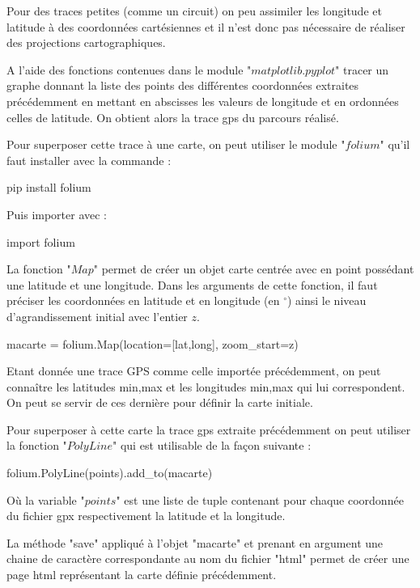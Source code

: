 Pour des traces petites (comme un circuit) on peu assimiler les longitude et latitude à des coordonnées cartésiennes et il n'est donc pas nécessaire de réaliser des projections cartographiques.

\question{} A l'aide des fonctions contenues dans le module "$matplotlib.pyplot$" tracer un graphe donnant la liste des points des différentes coordonnées extraites précédemment en mettant en abscisses les valeurs de longitude et en ordonnées celles de latitude. On obtient alors la trace gps du parcours réalisé.



Pour superposer cette trace à une carte, on peut utiliser le module "$folium$" qu'il faut installer avec la commande : 

\begin{pyverbatim}
pip install folium
\end{pyverbatim}

Puis importer avec :

\begin{pyverbatim}
import folium
\end{pyverbatim}

La fonction "$Map$" permet de créer un objet carte centrée avec en point possédant une latitude et une longitude. Dans les arguments de cette fonction, il faut préciser les coordonnées en latitude et en longitude (en $^{\circ}$) ainsi le niveau d'agrandissement initial avec l'entier $z$.

\begin{pyverbatim}
macarte = folium.Map(location=[lat,long], zoom_start=z)
\end{pyverbatim}

Etant donnée une trace GPS comme celle importée précédemment, on peut connaître les latitudes min,max et les longitudes min,max qui lui correspondent. On peut se servir de ces dernière pour définir la carte initiale.

Pour superposer à cette carte la trace gps extraite précédemment on peut utiliser la fonction "$PolyLine$" qui est utilisable de la façon suivante : 

\begin{pyverbatim}
folium.PolyLine(points).add_to(macarte)
\end{pyverbatim}

Où la variable "$points$" est une liste de tuple contenant pour chaque coordonnée du fichier gpx respectivement la latitude et la longitude.

La méthode "save" appliqué à l'objet "macarte" et prenant en argument une chaine de caractère correspondante au nom du fichier "html" permet de créer une page html représentant la carte définie précédemment.


